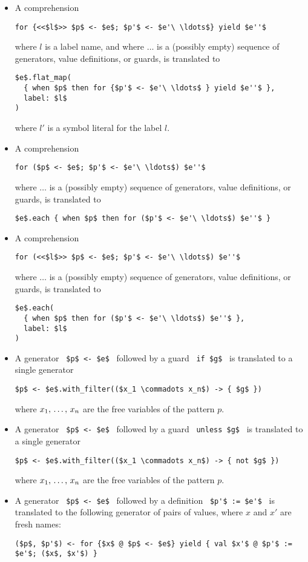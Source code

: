 \begin{itemize}
\item A comprehension 
\begin{lstlisting}
for {<<$l$>> $p$ <- $e$; $p'$ <- $e'\ \ldots$} yield $e''$
\end{lstlisting}
where $l$ is a label name, and where $\ldots$ is a (possibly empty) sequence of generators, value definitions, or guards, is translated to
\begin{lstlisting}[deletekeywords={label}]
$e$.flat_map(
  { when $p$ then for {$p'$ <- $e'\ \ldots$ } yield $e''$ },
  label: $l$
)
\end{lstlisting}
where $l'$ is a symbol literal for the label $l$. 

\item A comprehension 
\begin{lstlisting}
for ($p$ <- $e$; $p'$ <- $e'\ \ldots$) $e''$
\end{lstlisting}
where $\ldots$ is a (possibly empty) sequence of generators, value definitions, or guards, is translated to
\begin{lstlisting}
$e$.each { when $p$ then for ($p'$ <- $e'\ \ldots$) $e''$ }
\end{lstlisting}

\item A comprehension 
\begin{lstlisting}
for (<<$l$>> $p$ <- $e$; $p'$ <- $e'\ \ldots$) $e''$
\end{lstlisting}
where $\ldots$ is a (possibly empty) sequence of generators, value definitions, or guards, is translated to
\begin{lstlisting}[deletekeywords={label}]
$e$.each(
  { when $p$ then for ($p'$ <- $e'\ \ldots$) $e''$ },
  label: $l$
)
\end{lstlisting}

\item A generator ~\lstinline!$p$ <- $e$!~ followed by a guard ~\lstinline!if $g$!~ is translated to a single generator
\begin{lstlisting}
$p$ <- $e$.with_filter(($x_1 \commadots x_n$) -> { $g$ })
\end{lstlisting}
where $x_1 ,\, \ldots ,\, x_n$ are the free variables of the pattern $p$. 

\item A generator ~\lstinline!$p$ <- $e$!~ followed by a guard ~\lstinline!unless $g$!~ is translated to a single generator
\begin{lstlisting}
$p$ <- $e$.with_filter(($x_1 \commadots x_n$) -> { not $g$ })
\end{lstlisting}
where $x_1 ,\, \ldots ,\, x_n$ are the free variables of the pattern $p$. 

\item A generator ~\lstinline!$p$ <- $e$!~ followed by a definition ~\lstinline!$p'$ := $e'$!~ is translated to the following generator of pairs of values, where $x$ and $x'$ are fresh names:
\begin{lstlisting}
($p$, $p'$) <- for {$x$ @ $p$ <- $e$} yield { val $x'$ @ $p'$ := $e'$; ($x$, $x'$) }
\end{lstlisting}

\end{itemize}

